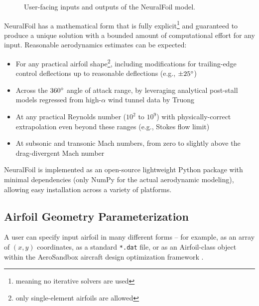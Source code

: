 \documentclass[conf]{new-aiaa}
\begin{document}
\begin{figure}[H]
        \caption{User-facing inputs and outputs of the NeuralFoil model.}
        \label{fig:neuralfoil_io}
    \end{figure}

    NeuralFoil has a mathematical form that is fully explicit\footnote{meaning no iterative solvers are used} and guaranteed to produce a unique solution with a bounded amount of computational effort for any input. Reasonable aerodynamics estimates can be expected:
    \begin{itemize}
        \item For any practical airfoil shape\footnote{only single-element airfoils are allowed}, including modifications for trailing-edge control deflections up to reasonable deflections (e.g., $\pm 25\degree$)
        \item Across the $360\degree$ angle of attack range, by leveraging analytical post-stall models regressed from high-$\alpha$ wind tunnel data by Truong \cite{truong_analytical_2020}
        \item At any practical Reynolds number ($10^2$ to $10^9$) with physically-correct extrapolation even beyond these ranges (e.g., Stokes flow limit)
        \item At subsonic and transonic Mach numbers, from zero to slightly above the drag-divergent Mach number
    \end{itemize}

    NeuralFoil is implemented as an open-source lightweight Python package with minimal dependencies (only NumPy \cite{harris_array_2020} for the actual aerodynamic modeling), allowing easy installation across a variety of platforms.

    \subsection{Airfoil Geometry Parameterization}
    \label{sec:airfoil-parameterization}

    A user can specify input airfoil in many different forms -- for example, as an array of $(x, y)$ coordinates, as a standard \texttt{*.dat} file, or as an Airfoil-class object within the AeroSandbox aircraft design optimization framework \cite{sharpe_aerosandbox_2021}.
\end{document}
